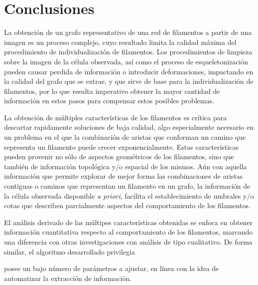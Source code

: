 \chapter{Conclusiones}
\label{chap:conclu}
La obtenci\'on de un grafo representativo de una red de filamentos a partir de una imagen es un proceso complejo, cuyo resultado limita la calidad m\'axima del procedimiento de individualizaci\'on de filamentos. Los procedimientos de limpieza sobre la imagen de la c\'elula observada, as\'i como el proceso de esqueletonizaci\'on pueden causar perdida de informaci\'on o introducir deformaciones, impactando en la calidad del grafo que se extrae, y que sirve de base para la individualizaci\'on de filamentos, por lo que resulta imperativo obtener la mayor cantidad de informaci\'on en estos pasos para compensar estos posibles problemas. 

La obtenci\'on de m\'ultiples caracter\'isticas de los filamentos es cr\'itica para descartar rapidamente soluciones de baja calidad, algo especialmente necesario en un problema en el que la combinaci\'on de aristas que conforman un camino que representa un filamento puede crecer exponencialmente. Estas caracter\'isticas pueden provenir no s\'olo de aspectos geom\'etricos de los filamentos, sino que tambi\'en de informaci\'on topol\'ogica y/o espacial de los mismos.
A\'un con aquella informaci\'on que permite explorar de mejor forma las combinaciones de aristas contiguas o caminos que representan un filamento en un grafo, la informaci\'on de la c\'elula observada disponible {\it a priori}, facilita el establecimiento de umbrales y/o cotas que describen parcialmente aspectos del comportamiento de los filamentos.

El an\'alisis derivado de las m\'ultipes caracter\'isticas obtenidas se enfoca en obtener informaci\'on cuantitativa respecto al comportamiento de los filamentos, marcando una diferencia con otras investigaciones con an\'alisis de tipo cualitativo. De forma similar, el algoritmo desarrollado privilegia 


posee un bajo n\'umero de par\'ametros a ajustar, en l\'inea con la idea de automatizar la extracci\'on de informaci\'on.



